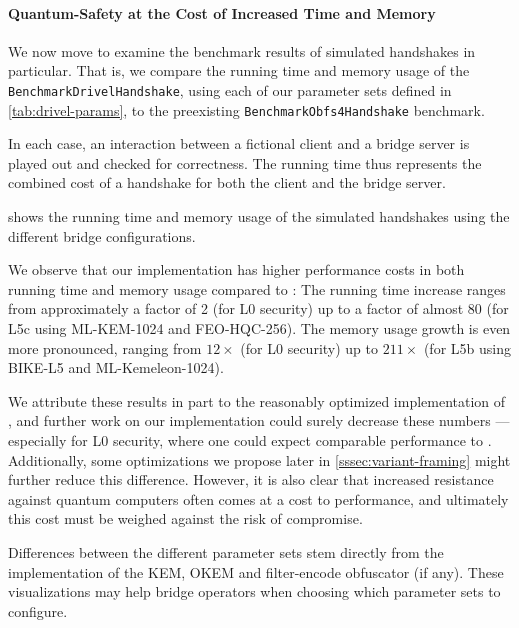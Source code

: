 \paragraph{Quantum-Safety at the Cost of Increased Time and Memory}

We now move to examine the benchmark results of simulated handshakes in particular.
That is, we compare the running time and memory usage of the \texttt{BenchmarkDrivelHandshake}, using each of our \drivel{} parameter sets defined in \cref{tab:drivel-params}, to the preexisting \texttt{BenchmarkObfs4Handshake} benchmark.

In each case, an interaction between a fictional client and a bridge server is played out and checked for correctness. The running time thus represents the combined cost of a handshake for both the client and the bridge server.

 shows the running time and memory usage of the simulated handshakes using the different bridge configurations.

We observe that our implementation has higher performance costs in both running time and memory usage compared to \obfsfour{}: The running time increase ranges from approximately a factor of 2 (for L0 security) up to a factor of almost 80 (for L5c using ML-KEM-1024 and FEO-HQC-256). The memory usage growth is even more pronounced, ranging from $12\times$ (for L0 security) up to $211\times$ (for L5b using BIKE-L5 and ML-Kemeleon-1024).

We attribute these results in part to the reasonably optimized implementation of \obfsfour{}, and further work on our implementation could surely decrease these numbers --- especially for L0 security, where one could expect comparable performance to \obfsfour{}. Additionally, some optimizations we propose later in \cref{sssec:variant-framing} might further reduce this difference.
However, it is also clear that increased resistance against quantum computers often comes at a cost to performance, and ultimately this cost must be weighed against the risk of compromise.

Differences between the different parameter sets stem directly from the implementation of the KEM, OKEM and filter-encode obfuscator (if any). These visualizations may help bridge operators when choosing which parameter sets to configure.

